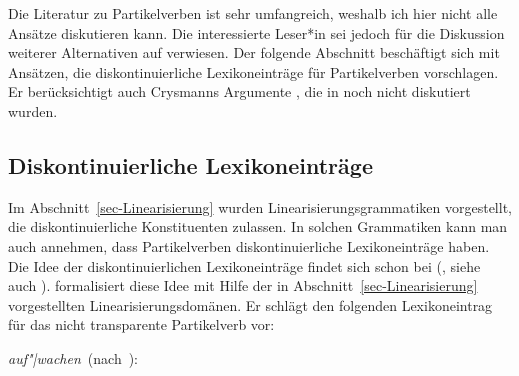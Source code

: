 Die Literatur zu Partikelverben ist sehr umfangreich, weshalb ich hier nicht alle Ansätze diskutieren
kann. Die interessierte Leser*in sei jedoch für die Diskussion weiterer Alternativen auf
 verwiesen. Der folgende Abschnitt beschäftigt sich mit
Ansätzen, die diskontinuierliche Lexikoneinträge für Partikelverben vorschlagen. Er berücksichtigt
auch Crysmanns Argumente \citeyearpar{Crysmann2002a}, die in  noch nicht
diskutiert wurden.

\subsection{Diskontinuierliche Lexikoneinträge}
\label{sec-disc-entry}

Im Abschnitt~\ref{sec-Linearisierung} wurden Linearisierungsgrammatiken vorgestellt, die
diskontinuierliche Konstituenten zulassen. In solchen Grammatiken kann man auch annehmen,
dass Partikelverben diskontinuierliche Lexikoneinträge haben. Die Idee der diskontinuierlichen
Lexikoneinträge findet sich schon bei %
\citeauthor{Wells47a} (\citeyear[]{Wells47a}, siehe auch \citeauthor{McCawley82a} \citeyear[]{McCawley82a}).
\citet*[--248]{Kathol95a} formalisiert diese Idee mit Hilfe
der in Abschnitt~\ref{sec-Linearisierung} vorgestellten Linearisierungsdomänen.
Er schlägt den folgenden Lexikoneintrag für das nicht transparente Partikelverb  
vor:

\eas
\label{le-aufwachen-kathol}%
\mbox{\emph{auf"|wachen} (nach \citet[]{Kathol95a}):}\\
\zs

